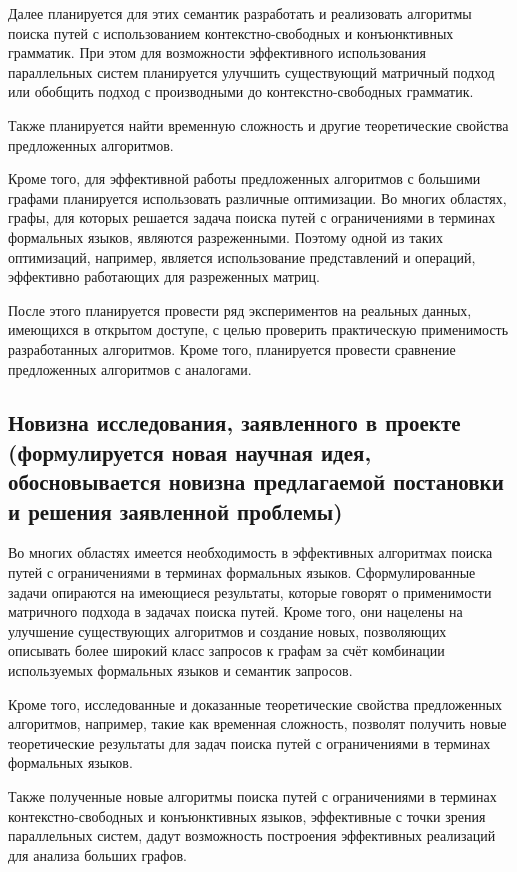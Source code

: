 \documentclass[12pt]{article}  %
\theoremstyle{remark}
\begin{document}
Далее планируется для этих семантик разработать и реализовать алгоритмы поиска путей с использованием контекстно-свободных и конъюнктивных грамматик. При этом для возможности эффективного использования параллельных систем планируется улучшить существующий матричный подход или обобщить подход с производными до контекстно-свободных грамматик.

Также планируется найти временную сложность и другие теоретические свойства предложенных алгоритмов.

Кроме того, для эффективной работы предложенных алгоритмов с большими графами планируется использовать различные оптимизации. Во многих областях, графы, для которых решается задача поиска путей с ограничениями в терминах формальных языков, являются разреженными. Поэтому одной из таких оптимизаций, например, является использование представлений и операций, эффективно работающих для разреженных матриц.

После этого планируется провести ряд экспериментов на реальных данных, имеющихся в открытом доступе, с целью проверить практическую применимость разработанных алгоритмов. Кроме того, планируется провести сравнение предложенных алгоритмов с аналогами.

\subsection{Новизна исследования, заявленного в проекте (формулируется новая научная идея, обосновывается новизна предлагаемой постановки и решения заявленной проблемы)}
Во многих областях имеется необходимость в эффективных алгоритмах поиска путей с ограничениями в терминах формальных языков. Сформулированные задачи опираются на имеющиеся результаты, которые говорят о применимости матричного подхода в задачах поиска путей. Кроме того, они нацелены на улучшение существующих алгоритмов и создание новых, позволяющих описывать более широкий класс запросов к графам за счёт комбинации используемых формальных языков и семантик запросов.

Кроме того, исследованные и доказанные теоретические свойства предложенных алгоритмов, например, такие как временная сложность, позволят получить новые теоретические результаты для задач поиска путей с ограничениями в терминах формальных языков.

Также полученные новые алгоритмы поиска путей с ограничениями в терминах контекстно-свободных и конъюнктивных языков, эффективные с точки зрения параллельных систем, дадут возможность построения эффективных реализаций для анализа больших графов.
\end{document}
